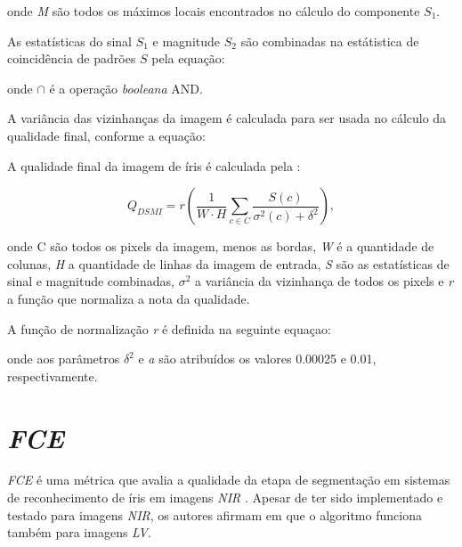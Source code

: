 
\noindent onde \textit{M} são todos os máximos locais encontrados no cálculo do componente $S_{1}$.

\par As estatísticas do sinal \textit{$S_{1}$} e magnitude \textit{$S_{2}$} são combinadas na estátistica de coincidência de padrões $S$ pela equação:


\noindent onde $\cap$ é a operação \textit{booleana} AND.

\par A variância das vizinhanças da imagem é calculada para ser usada no cálculo da qualidade final, conforme a equação:



\par A qualidade final da imagem de íris é calculada pela :

\begin{equation}\label{eq:dsmi:Q}
  Q_{DSMI} = r(\frac{1}{W\cdot H}\sum_{c \in C}\frac{S(c)}{\sigma^2(c) + \delta^2}),
\end{equation}

\noindent onde C são todos os pixels da imagem, menos as bordas, \textit{W} é a quantidade de colunas, \textit{H} a quantidade de linhas da imagem de entrada, \textit{S} são as estatísticas de sinal e magnitude combinadas, $\sigma^{2}$ a variância da vizinhança de todos os pixels e \textit{r} a função que normaliza a nota da qualidade.

\par A função de normalização \textit{r} é definida na seguinte equaçao:

\equacao{eq:dsmi:r}{
    r : [0, \infty) \to [0, 1) \quad x \mapsto 1 - e^{-ax},
}

\noindent onde aos parâmetros $\delta^2$ e \textit{a} são atribuídos os valores 0.00025 e 0.01, respectivamente.


\section{\textit{\acrfull{FCE}}} \label{sec:revisao:fce}

\par \textit{\acrfull{FCE}} é uma métrica que avalia a qualidade da etapa de segmentação em sistemas de reconhecimento de íris em imagens \textit{\acrfull{NIR}} \cite{du2010}. Apesar de ter sido implementado e testado para imagens \textit{\acrshort{NIR}}, os autores afirmam em \cite{zhou2012} que o algoritmo funciona também para imagens \textit{\acrshort{LV}}. 

